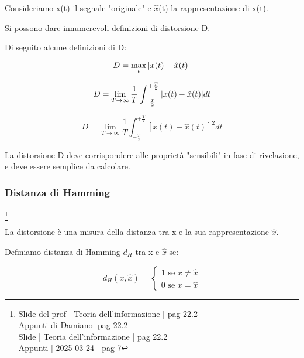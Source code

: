 Consideriamo x(t) il segnale "originale" e $\hat{x}$(t) la rappresentazione di x(t). \newline 

Si possono dare innumerevoli definizioni di distorsione D. \newline 

Di seguito alcune definizioni di D: 

{
    \Large 
    \begin{equation}
        D = \max_t \abs{x (t) - \hat{x} (t)}
    \end{equation}
}

{
    \Large 
    \begin{equation}
        D = \lim_{T \to \infty} \frac{1}{T} \int_{- \frac{T}{2}}^{+ \frac{T}{2}} \abs{x (t) - \hat{x} (t)} dt
    \end{equation}
}


{
    \Large 
    \begin{equation}
        D = \lim_{T \to \infty} \frac{1}{T} \int_{- \frac{T}{2}}^{+ \frac{T}{2}} \left[x (t) - \hat{x} (t) \right]^{2} dt
    \end{equation}
}

La distorsione D deve corrispondere alle proprietà "sensibili" in fase di rivelazione, e deve essere semplice da calcolare. \newline 

\newpage 

\subsubsection{Distanza di Hamming}
\footnote{Slide del prof | Teoria dell'informazione | pag 22.2 \\  
Appunti di Damiano| pag 22.2 \\
Slide | Teoria dell'informazione | pag 22.2 \\
Appunti | 2025-03-24 | pag 7
}

La distorsione è una misura della distanza tra x e la sua rappresentazione $\hat{x}$. \newline 

Definiamo distanza di Hamming $d_H$ tra x e $\hat{x}$ se:

{
    \Large 
    \begin{equation}
        d_H (x, \hat{x})
        = 
        \begin{cases}
            1 \text{ se } x \neq \hat{x}
            \\
            0 \text{ se } x = \hat{x}
        \end{cases}
    \end{equation}
}

